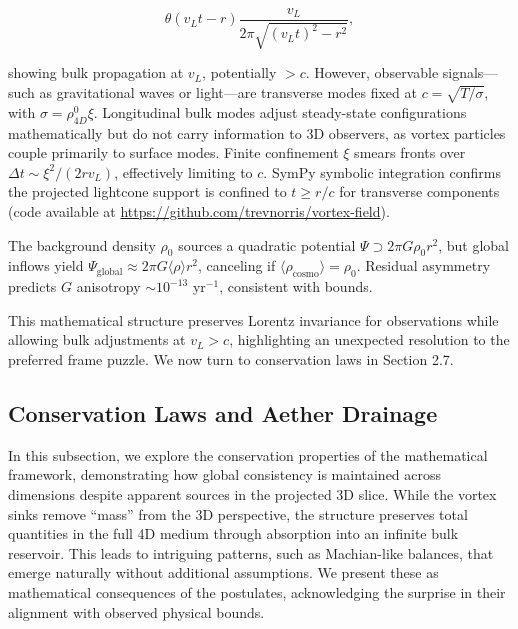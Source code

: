 \begin{equation}
\theta(v_L t - r) \frac{v_L}{2\pi \sqrt{(v_L t)^2 - r^2}},
\end{equation}

showing bulk propagation at $v_L$, potentially $>c$. However, observable signals---such as gravitational waves or light---are transverse modes fixed at $c = \sqrt{T / \sigma}$, with $\sigma = \rho_{4D}^0 \xi$. Longitudinal bulk modes adjust steady-state configurations mathematically but do not carry information to 3D observers, as vortex particles couple primarily to surface modes. Finite confinement $\xi$ smears fronts over $\Delta t \sim \xi^2 / (2 r v_L)$, effectively limiting to $c$. SymPy symbolic integration confirms the projected lightcone support is confined to $t \geq r / c$ for transverse components (code available at \url{https://github.com/trevnorris/vortex-field}).

The background density $\rho_0$ sources a quadratic potential $\Psi \supset 2\pi G \rho_0 r^2$, but global inflows yield $\Psi_{\text{global}} \approx 2\pi G \langle \rho \rangle r^2$, canceling if $\langle \rho_{\text{cosmo}} \rangle = \rho_0$. Residual asymmetry predicts $G$ anisotropy $\sim 10^{-13}$ yr$^{-1}$, consistent with bounds.

\medskip
\noindent
{}
\medskip

This mathematical structure preserves Lorentz invariance for observations while allowing bulk adjustments at $v_L > c$, highlighting an unexpected resolution to the preferred frame puzzle. We now turn to conservation laws in Section 2.7.

\subsection{Conservation Laws and Aether Drainage}

In this subsection, we explore the conservation properties of the mathematical framework, demonstrating how global consistency is maintained across dimensions despite apparent sources in the projected 3D slice. While the vortex sinks remove ``mass'' from the 3D perspective, the structure preserves total quantities in the full 4D medium through absorption into an infinite bulk reservoir. This leads to intriguing patterns, such as Machian-like balances, that emerge naturally without additional assumptions. We present these as mathematical consequences of the postulates, acknowledging the surprise in their alignment with observed physical bounds.

